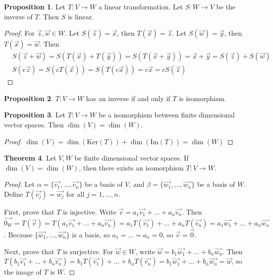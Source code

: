 \documentclass{article}
\theoremstyle{definition}
\newtheorem{theorem}{Theorem}[section]
\newtheorem{proposition}[theorem]{Proposition}
\theoremstyle{remark}
\begin{document}
\begin{proposition}
    Let $T:V\rightarrow W$ a linear transformation. 
    Let $S:W\rightarrow V$ be the inverse of $T$.
    Then $S$ is linear.
\end{proposition}

\begin{proof}
    For $\vec{z},\vec{w}\in W$.
    Let $S(\vec{z})=\vec{x}$, then $T(\vec{x})=\vec{z}$.
    Let $S(\vec{w})=\vec{y}$, then $T(\vec{x})=\vec{w}$.
    Then
    \[
    \begin{aligned}
        &S(\vec{z}+\vec{w})=S(T(\vec{x})+T(\vec{y}))=S(T(\vec{x}+\vec{y}))=\vec{x}+\vec{y}=S(\vec{z})+S(\vec{w})\\
        &S(c\vec{z})=S(cT(\vec{x}))=S(T(c\vec{x}))=c\vec{x}=cS(\vec{z})
    \end{aligned}
    \]
\end{proof}

\begin{proposition}
    $T:V\rightarrow W$ has an inverse if and only if $T$ is isomorphism.
\end{proposition}

\begin{proposition}
    Let $T:V\rightarrow W$ be a isomorphism between finite dimensional vector spaces. Then $\dim (V)=\dim (W)$.
\end{proposition}

\begin{proof}
$\dim (V)=\dim (\text{Ker}(T))+\dim (\text{Im}(T))=\dim (W)$
\end{proof}

\begin{theorem}
    Let $V,W$ be finite dimensional vector spaces.
    If $\dim (V)=\dim(W)$, then there exists an isomorphism $T:V\rightarrow W$.
\end{theorem}

\begin{proof}
    Let $\alpha=\{\vec{v_1},\dots, \vec{v_n}\}$ be a basis of $V$, and $\beta=\{\vec{w_1},\dots, \vec{w_n}\}$ be a basis of $W$.
    Define $T(\vec{v_j})=\vec{w_j}$ for all $j=1,\dots,n$.

    First, prove that $T$ is injective.
    Write $\vec{v}=a_1\vec{v_1}+\dots+a_n\vec{v_n}$.
    Then $\vec{0_W}=T(\vec{v})=T(a_1\vec{v_1}+\dots+a_n\vec{v_n})=a_1T(\vec{v_1})+\dots+a_nT(\vec{v_n})=a_1\vec{w_1}+\dots+a_n\vec{w_n}$.
    Because $\{\vec{w_1},\dots, \vec{w_n}\}$ is a basis, so $a_1=\dots =a_n=0$, so $\vec{v}=\vec{0}$.

    Next, prove that $T$ is surjective.
    For $\vec{w}\in W$, write $\vec{w}=b_1\vec{w_1}+\dots+b_n\vec{w_n}$.
    Then $T(b_1\vec{v_1}+\dots+b_n\vec{v_n})=b_1T(\vec{v_1})+\dots+b_nT(\vec{v_n})=b_1\vec{w_1}+\dots+b_n\vec{w_n}=\vec{w}$, so the image of $T$ is $W$.

\end{proof}
\end{document}
